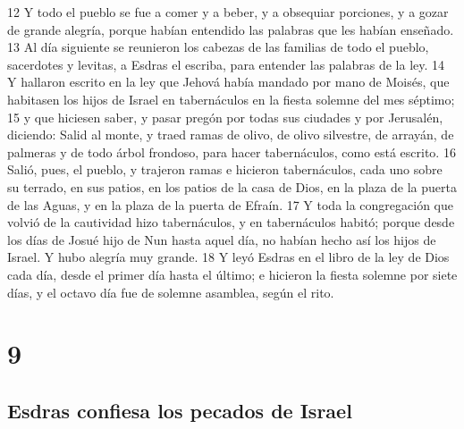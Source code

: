12 Y todo el pueblo se fue a comer y a beber, y a obsequiar porciones, y a gozar de grande alegría, porque habían entendido las palabras que les habían enseñado.
13 Al día siguiente se reunieron los cabezas de las familias de todo el pueblo, sacerdotes y levitas, a Esdras el escriba, para entender las palabras de la ley.
14 Y hallaron escrito en la ley que Jehová había mandado por mano de Moisés, que habitasen los hijos de Israel en tabernáculos en la fiesta solemne del mes séptimo;
15 y que hiciesen saber, y pasar pregón por todas sus ciudades y por Jerusalén, diciendo: Salid al monte, y traed ramas de olivo, de olivo silvestre, de arrayán, de palmeras y de todo árbol frondoso, para hacer tabernáculos, como está escrito. 
16 Salió, pues, el pueblo, y trajeron ramas e hicieron tabernáculos, cada uno sobre su terrado, en sus patios, en los patios de la casa de Dios, en la plaza de la puerta de las Aguas, y en la plaza de la puerta de Efraín.
17 Y toda la congregación que volvió de la cautividad hizo tabernáculos, y en tabernáculos habitó; porque desde los días de Josué hijo de Nun hasta aquel día, no habían hecho así los hijos de Israel. Y hubo alegría muy grande.
18 Y leyó Esdras en el libro de la ley de Dios cada día, desde el primer día hasta el último; e hicieron la fiesta solemne por siete días, y el octavo día fue de solemne asamblea, según el rito.

\chapter{9}

\section*{Esdras confiesa los pecados de Israel}


